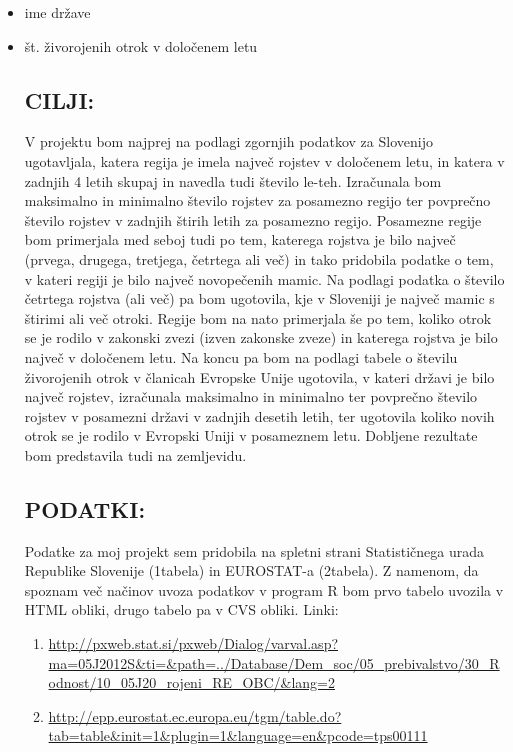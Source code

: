 \documentclass[11pt,a4paper]{article}
\begin{document}
\begin{itemize}
\item{ime države}
\item{št. živorojenih otrok v določenem letu}

 

\subsection{CILJI:}
V projektu bom najprej na podlagi zgornjih podatkov za Slovenijo ugotavljala, katera regija je imela največ rojstev v določenem letu, in katera v zadnjih 4 letih skupaj in navedla tudi število le-teh. Izračunala bom maksimalno in minimalno število rojstev za posamezno regijo ter povprečno število rojstev v zadnjih štirih letih za posamezno regijo. Posamezne regije bom primerjala med seboj tudi po tem, katerega rojstva je bilo največ (prvega, drugega, tretjega, četrtega ali več) in tako pridobila podatke o tem, v kateri regiji je bilo največ novopečenih mamic. Na podlagi podatka o število četrtega rojstva (ali več) pa bom ugotovila, kje v Sloveniji je največ mamic s štirimi ali več otroki.
Regije bom na nato primerjala še po tem, koliko otrok se je rodilo v zakonski zvezi (izven zakonske zveze) in katerega rojstva je bilo največ v določenem letu.
Na koncu pa bom na podlagi tabele o številu živorojenih otrok v članicah Evropske Unije ugotovila, v kateri državi je bilo največ rojstev, izračunala maksimalno in minimalno ter povprečno število rojstev v posamezni državi v zadnjih desetih letih, ter ugotovila koliko novih otrok se je rodilo v Evropski Uniji v posameznem letu.
Dobljene rezultate bom predstavila tudi na zemljevidu.

 

\subsection{PODATKI:}
Podatke za moj projekt sem pridobila na spletni strani Statističnega urada Republike Slovenije (1tabela) in EUROSTAT-a (2tabela). Z namenom, da spoznam več načinov uvoza podatkov v program R bom prvo tabelo uvozila v HTML obliki, drugo tabelo pa v CVS obliki.
Linki:
\begin{enumerate}
\item{\url{http://pxweb.stat.si/pxweb/Dialog/varval.asp?ma=05J2012S&ti=&path=../Database/Dem_soc/05_prebivalstvo/30_Rodnost/10_05J20_rojeni_RE_OBC/&lang=2}}
\item{\url{http://epp.eurostat.ec.europa.eu/tgm/table.do?tab=table&init=1&plugin=1&language=en&pcode=tps00111}}
\end{enumerate}



\end{itemize}
\end{document}
